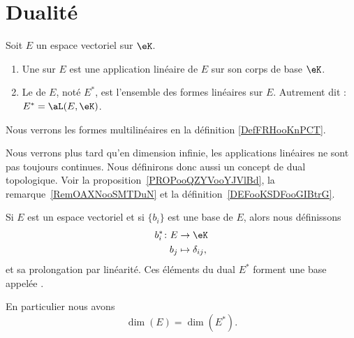 \section{Dualité}

\begin{definition}  \label{DefJPGSHpn}
	Soit \( E\) un espace vectoriel sur \( \eK\).
	\begin{enumerate}
		\item
		      Une  sur \( E \) est une application linéaire de \( E \) sur son corps de base \( \eK\).
		\item
		      Le  de \( E\), noté \( E^*\), est l'ensemble des formes linéaires sur \( E\). Autrement dit : \( E^* = \aL(E,\eK)\).
	\end{enumerate}
\end{definition}
Nous verrons les formes multilinéaires en la définition \ref{DefFRHooKnPCT}.

Nous verrons plus tard qu'en dimension infinie, les applications linéaires ne sont pas toujours continues. Nous définirons donc aussi un concept de dual topologique. Voir la proposition~\ref{PROPooQZYVooYJVlBd}, la remarque~\ref{RemOAXNooSMTDuN} et la définition~\ref{DEFooKSDFooGIBtrG}.

\begin{lemmaDef}      \label{DEFooTMSEooZFtsqa}
	Si \( E\) est un espace vectoriel et si \( \{ b_i \}\) est une base de \( E\), alors nous définissons
	\begin{equation}
		\begin{aligned}
			b_i^*\colon E & \to \eK              \\
			b_j           & \mapsto \delta_{ij},
		\end{aligned}
	\end{equation}
	et sa prolongation par linéarité. Ces éléments du dual \( E^*\) forment une base appelée .

	En particulier nous avons
	\begin{equation}
		\dim(E)=\dim(E^*).
	\end{equation}
\end{lemmaDef}

